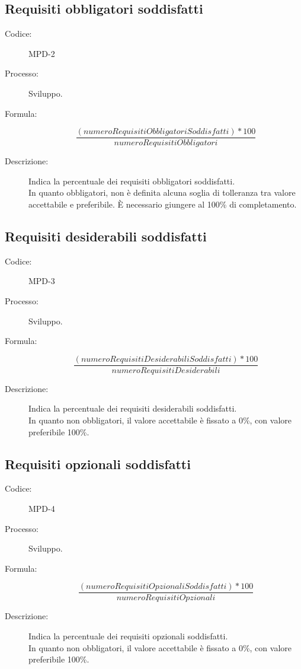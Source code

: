 \subsection{Requisiti obbligatori soddisfatti}
\begin{description}
    \item[Codice:] MPD-2
    \item[Processo:] Sviluppo.
    \item[Formula:]
    \begin{equation}
        \frac{(numeroRequisitiObbligatoriSoddisfatti) * 100}{numeroRequisitiObbligatori}
    \end{equation}
    \item[Descrizione:] Indica la percentuale dei requisiti obbligatori soddisfatti.\\ In quanto obbligatori, non è definita alcuna soglia di tolleranza tra valore accettabile e preferibile. È necessario giungere al 100\% di completamento.
\end{description}

\subsection{Requisiti desiderabili soddisfatti}
\begin{description}
    \item[Codice:] MPD-3
    \item[Processo:] Sviluppo.
    \item[Formula:]
    \begin{equation}
        \frac{(numeroRequisitiDesiderabiliSoddisfatti) * 100}{numeroRequisitiDesiderabili}
    \end{equation}
    \item[Descrizione:] Indica la percentuale dei requisiti desiderabili soddisfatti.\\ In quanto non obbligatori, il valore accettabile è fissato a 0\%, con valore preferibile 100\%.
\end{description}

\subsection{Requisiti opzionali soddisfatti}
\begin{description}
    \item[Codice:] MPD-4
    \item[Processo:] Sviluppo.
    \item[Formula:]
    \begin{equation}
        \frac{(numeroRequisitiOpzionaliSoddisfatti) * 100}{numeroRequisitiOpzionali}
    \end{equation}
    \item[Descrizione:] Indica la percentuale dei requisiti opzionali soddisfatti.\\ In quanto non obbligatori, il valore accettabile è fissato a 0\%, con valore preferibile 100\%.
\end{description}

